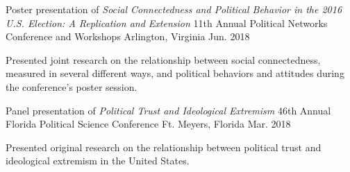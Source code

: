 

\begin{cventries}

\cventry
  {Poster presentation of \emph{Social Connectedness and Political Behavior in the 2016 U.S. Election: A Replication and Extension}} %
  {11th Annual Political Networks Conference and Workshops} %
  {Arlington, Virginia} %
  {Jun. 2018} %
  {
    \begin{cvitems} %
      \item {Presented joint research on the relationship between social connectedness, measured in several different ways, and political behaviors and attitudes during the conference's poster session.}
    \end{cvitems}
  }

  \cventry
    {Panel presentation of \emph{Political Trust and Ideological Extremism}} %
    {46th Annual Florida Political Science Conference} %
    {Ft. Meyers, Florida} %
    {Mar. 2018} %
    {
      \begin{cvitems} %
        \item {Presented original research on the relationship between political trust and ideological extremism in the United States.}
      \end{cvitems}
    }


\end{cventries}
